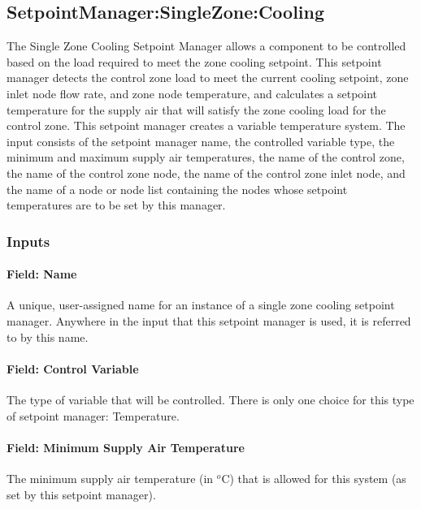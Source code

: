 \subsection{SetpointManager:SingleZone:Cooling}\label{setpointmanagersinglezonecooling}

The Single Zone Cooling Setpoint Manager allows a component to be controlled based on the load required to meet the zone cooling setpoint. This setpoint manager detects the control zone load to meet the current cooling setpoint, zone inlet node flow rate, and zone node temperature, and calculates a setpoint temperature for the supply air that will satisfy the zone cooling load for the control zone. This setpoint manager creates a variable temperature system. The input consists of the setpoint manager name, the controlled variable type, the minimum and maximum supply air temperatures, the name of the control zone, the name of the control zone node, the name of the control zone inlet node, and the name of a node or node list containing the nodes whose setpoint temperatures are to be set by this manager.

\subsubsection{Inputs}\label{inputs-5-027}

\paragraph{Field: Name}\label{field-name-5-022}

A unique, user-assigned name for an instance of a single zone cooling setpoint manager. Anywhere in the input that this setpoint manager is used, it is referred to by this name.

\paragraph{Field: Control Variable}\label{field-control-variable-5}

The type of variable that will be controlled. There is only one choice for this type of setpoint manager: Temperature.

\paragraph{Field: Minimum Supply Air Temperature}\label{field-minimum-supply-air-temperature-2}

The minimum supply air temperature (in \(^{o}\)C) that is allowed for this system (as set by this setpoint manager).


